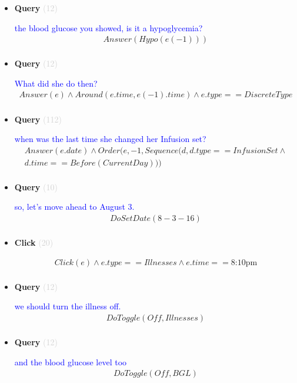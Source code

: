 \documentclass[11pt]{article}
\newcommand{\key}[1]{\textcolor{lightgray}{#1}}
\newcounter{CQuery}
\newcounter{CClick}
\begin{document}
\begin{itemize}
\item
\textbf{Query\theCQuery} \key{(12)} \addtocounter{CQuery}{1}
\textcolor{blue}{ the blood glucose you showed, is it a hypoglycemia? }
\begin{multline*}
Answer(Hypo(e(-1))) \\ 
\end{multline*}


\item
\textbf{Query\theCQuery} \key{(12)} \addtocounter{CQuery}{1}
\textcolor{blue}{ What did she do then? }
\begin{multline*}
Answer(e) \wedge Around(e.time, e(-1).time) \wedge e.type==DiscreteType \\ 
\end{multline*}


\item
\textbf{Query\theCQuery} \key{(112)} \addtocounter{CQuery}{1}
\textcolor{blue}{ when was the last time she changed her Infusion set? }
\begin{multline*}
Answer(e.date) \wedge Order(e, -1, Sequence(d, d.type==InfusionSet\wedge \\ 
d.time==Before(CurrentDay))) \\ 
\end{multline*}


\item
\textbf{Query\theCQuery} \key{(10)} \addtocounter{CQuery}{1}
\textcolor{blue}{ so, let's move ahead to August 3. }
\begin{multline*}
DoSetDate(8-3-16) \\ 
\end{multline*}


\item
\textbf{Click\theCClick} \key{(20)} \addtocounter{CClick}{1}
\textcolor{blue}{  }
\begin{multline*}
Click(e) \wedge e.type==Illnesses \wedge e.time==\mbox{8:10pm} \\ 
\end{multline*}


\item
\textbf{Query\theCQuery} \key{(12)} \addtocounter{CQuery}{1}
\textcolor{blue}{ we should turn the illness off. }
\begin{multline*}
DoToggle(Off, Illnesses) \\ 
\end{multline*}


\item
\textbf{Query\theCQuery} \key{(12)} \addtocounter{CQuery}{1}
\textcolor{blue}{ and the blood glucose level too }
\begin{multline*}
DoToggle(Off, BGL) \\ 
\end{multline*}



\end{itemize}
\end{document}
